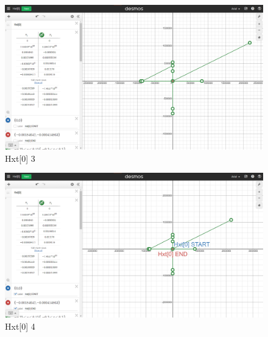 \begin{figure}[H]
    \includegraphics[width=\columnwidth]{figs/Hxt[0]_3}
    \caption{Hxt[0] 3}
\end{figure}
\begin{figure}[H]
    \includegraphics[width=\columnwidth]{figs/Hxt[0]_4}
    \caption{Hxt[0] 4}
\end{figure}

